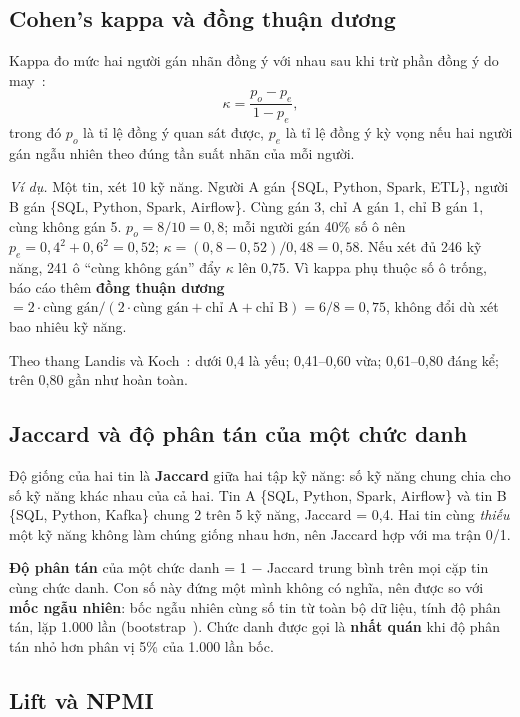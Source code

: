 \documentclass[12pt]{article}
\begin{document}
\subsection{Cohen's kappa và đồng thuận dương}
\label{sec:kappa}

Kappa đo mức hai người gán nhãn đồng ý với nhau sau khi trừ phần đồng ý do may~\cite{cohen1960kappa}:
\begin{equation}
\kappa = \frac{p_o - p_e}{1 - p_e},
\end{equation}
trong đó $p_o$ là tỉ lệ đồng ý quan sát được, $p_e$ là tỉ lệ đồng ý kỳ vọng nếu hai người gán ngẫu nhiên theo đúng tần suất nhãn của mỗi người.

\textit{Ví dụ.} Một tin, xét 10 kỹ năng. Người A gán \{SQL, Python, Spark, ETL\}, người B gán \{SQL, Python, Spark, Airflow\}. Cùng gán 3, chỉ A gán 1, chỉ B gán 1, cùng không gán 5. $p_o = 8/10 = 0{,}8$; mỗi người gán 40\% số ô nên $p_e = 0{,}4^2 + 0{,}6^2 = 0{,}52$; $\kappa = (0{,}8 - 0{,}52)/0{,}48 = 0{,}58$. Nếu xét đủ 246 kỹ năng, 241 ô ``cùng không gán'' đẩy $\kappa$ lên 0,75. Vì kappa phụ thuộc số ô trống, báo cáo thêm \textbf{đồng thuận dương} $= 2\cdot\text{cùng gán}/(2\cdot\text{cùng gán} + \text{chỉ A} + \text{chỉ B}) = 6/8 = 0{,}75$, không đổi dù xét bao nhiêu kỹ năng.

Theo thang Landis và Koch~\cite{landis1977kappa}: dưới 0,4 là yếu; 0,41--0,60 vừa; 0,61--0,80 đáng kể; trên 0,80 gần như hoàn toàn.

\subsection{Jaccard và độ phân tán của một chức danh}
\label{sec:jaccard}

Độ giống của hai tin là \textbf{Jaccard} giữa hai tập kỹ năng: số kỹ năng chung chia cho số kỹ năng khác nhau của cả hai. Tin A \{SQL, Python, Spark, Airflow\} và tin B \{SQL, Python, Kafka\} chung 2 trên 5 kỹ năng, Jaccard = 0,4. Hai tin cùng \textit{thiếu} một kỹ năng không làm chúng giống nhau hơn, nên Jaccard hợp với ma trận 0/1.

\textbf{Độ phân tán} của một chức danh = 1 $-$ Jaccard trung bình trên mọi cặp tin cùng chức danh. Con số này đứng một mình không có nghĩa, nên được so với \textbf{mốc ngẫu nhiên}: bốc ngẫu nhiên cùng số tin từ toàn bộ dữ liệu, tính độ phân tán, lặp 1.000 lần (bootstrap~\cite{efron1979bootstrap}). Chức danh được gọi là \textbf{nhất quán} khi độ phân tán nhỏ hơn phân vị 5\% của 1.000 lần bốc.

\subsection{Lift và NPMI}
\end{document}
